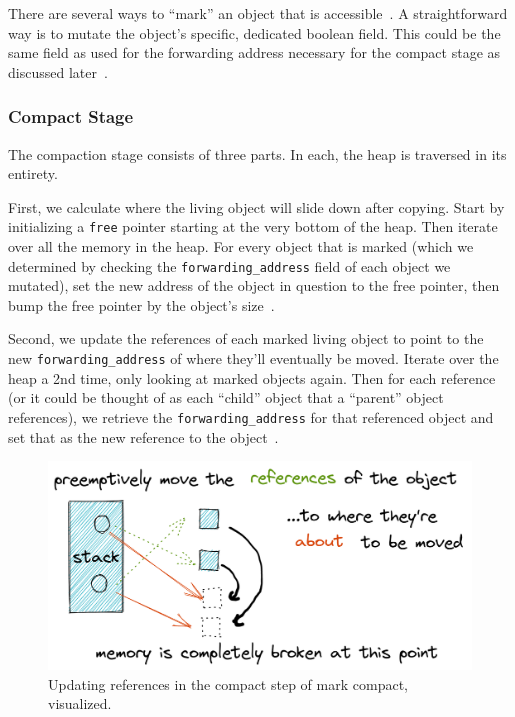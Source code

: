 \documentclass[index]{subfiles}
\begin{document}
There are several ways to ``mark'' an object that is accessible~\parencite[Chapter~3]{gc_handbook}. A straightforward way is to mutate the object's specific, dedicated boolean field. This could be the same field as used for the forwarding address necessary for the compact stage as discussed later~\parencite[Chapter~1]{gc_handbook}.

\subsubsection{Compact Stage}

The compaction stage consists of three parts. In each, the heap is traversed in its entirety.

First, we calculate where the living object will slide down after copying. Start by initializing a \verb+free+ pointer starting at the very bottom of the heap. Then iterate over all the memory in the heap. For every object that is marked (which we determined by checking the \verb+forwarding_address+ field of each object we mutated), set the new address of the object in question to the free pointer, then bump the free pointer by the object's size~\parencites[Chapter~3]{gc_handbook}[Sections~3.3--3.5]{redhat_openjdk}. 

Second, we update the references of each marked living object to point to the new \verb+forwarding_address+ of where they'll eventually be moved. Iterate over the heap a 2nd time, only looking at marked objects again. Then for each reference (or it could be thought of as each ``child'' object that a ``parent'' object references), we retrieve the \verb+forwarding_address+ for that referenced object and set that as the new reference to the object~\parencites[Chapter 3]{gc_handbook}[Sec.~3.4]{redhat_openjdk}.

\begin{figure}[H]
    \centering
    \includegraphics[scale=0.3]{pics/update-references.png}
    \caption{Updating references in the compact step of mark compact, visualized.}
\end{figure}
\end{document}
